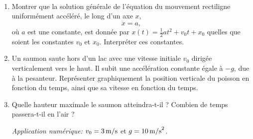 %
%

\\[-4mm]
\begin{enumerate}
\item Montrer que la solution générale de l'équation du mouvement rectiligne uniform\'ement acc\'el\'er\'e, le long d'un axe $x$,  
\[
\ddot{x} = a ,
\]
où $a$ est une constante, est donn\'ee par $x(t) = \frac{1}{2}at^2 + v_0t + x_0$ quelles que soient les constantes $v_0$ et $x_0$. Interpr\'eter ces constantes. 

\item Un saumon saute hors d'un lac avec une vitesse initiale $v_0$ dirig\'ee verticalement vers le haut. Il subit une acc\'el\'eration constante \'egale \`a $-g$, due \`a la pesanteur. Repr\'esenter graphiquement la position verticale du poisson en fonction du temps, ainsi que sa vitesse en fonction du temps.

\item Quelle hauteur maximale le saumon atteindra-t-il ? Combien de temps passera-t-il en l'air ?

\emph{Application num\'erique:} $v_0 = 3\, {\rm m/s}$ et $g = 10\, {\rm m/s}^2$.  \\

\end{enumerate}